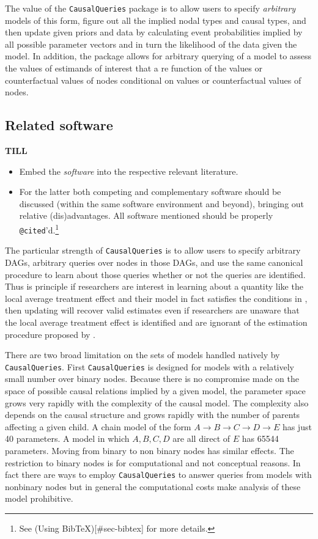 \documentclass[
  11pt,
  article]{jss}
\begin{document}
The value of the \texttt{CausalQueries} package is to allow users to
specify \emph{arbitrary} models of this form, figure out all the implied
nodal types and causal types, and then update given priors and data by
calculating event probabilities implied by all possible parameter
vectors and in turn the likelihood of the data given the model. In
addition, the package allows for arbitrary querying of a model to assess
the values of estimands of interest that a re function of the values or
counterfactual values of nodes conditional on values or counterfactual
values of nodes.

\hypertarget{related-software}{%
\subsection{Related software}\label{related-software}}

\textbf{TILL}

\begin{itemize}
\item
  Embed the \emph{software} into the respective relevant literature.
\item
  For the latter both competing and complementary software should be
  discussed (within the same software environment and beyond), bringing
  out relative (dis)advantages. All software mentioned should be
  properly \texttt{@cited}'d.\footnote{See (Using
    BibTeX){[}\#sec-bibtex{]} for more details.}
\end{itemize}

The particular strength of \texttt{CausalQueries} is to allow users to
specify arbitrary DAGs, arbitrary queries over nodes in those DAGs, and
use the same canonical procedure to learn about those queries whether or
not the queries are identified. Thus is principle if researchers are
interest in learning about a quantity like the local average treatment
effect and their model in fact satisfies the conditions in
\citet{angrist1996identification}, then updating will recover valid
estimates even if researchers are unaware that the local average
treatment effect is identified and are ignorant of the estimation
procedure proposed by \citet{angrist1996identification}.

There are two broad limitation on the sets of models handled natively by
\texttt{CausalQueries}. First \texttt{CausalQueries} is designed for
models with a relatively small number over binary nodes. Because there
is no compromise made on the space of possible causal relations implied
by a given model, the parameter space grows very rapidly with the
complexity of the causal model. The complexity also depends on the
causal structure and grows rapidly with the number of parents affecting
a given child. A chain model of the form
\(A \rightarrow B \rightarrow C \rightarrow D \rightarrow E\) has just
40 parameters. A model in which \(A, B, C, D\) are all direct of \(E\)
has 65544 parameters. Moving from binary to non binary nodes has similar
effects. The restriction to binary nodes is for computational and not
conceptual reasons. In fact there are ways to employ
\texttt{CausalQueries} to answer queries from models with nonbinary
nodes but in general the computational costs make analysis of these
model prohibitive.
\end{document}
